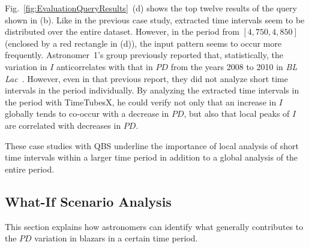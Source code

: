Fig.~\ref{fig:EvaluationQueryResults}~(d) shows the top twelve results of the query shown in (b).
Like in the previous case study, 
extracted time intervals seem to be distributed over the entire dataset. %
However, in the period from $[4{,}750, 4{,}850]$ (enclosed by a red rectangle in (d)), 
the input pattern seems to occur more frequently.
Astronomer~1's group previously reported that, statistically, the variation in $I$ anticorrelates with that in $PD$ from the years 2008 to 2010 in \emph{BL Lac}~\cite{Gaur2014}.
However, even in that previous report, they did not analyze short time intervals in the period individually.
By analyzing the extracted time intervals in the period with TimeTubesX, he could verify not only that an increase in $I$ globally tends to co-occur with a decrease in $PD$, 
but also that local peaks of $I$ are correlated with decreases in $PD$.

These case studies with QBS underline the importance of local analysis of short time intervals within a larger time period in addition to a global analysis of the entire period.

%
%
\subsection{What-If Scenario Analysis}\label{sec:whatif}
This section explains how astronomers can identify what generally contributes to the $PD$ variation in blazars in a certain time period. 

